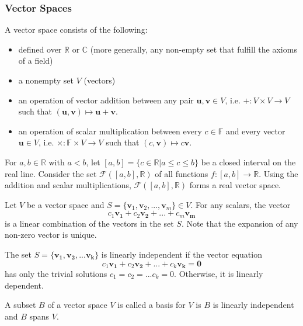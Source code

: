 \documentclass[a4paper]{article}
\begin{document}
\subsubsection*{Vector Spaces}
\begin{defi}
A vector space consists of the following:
\begin{itemize}
\item defined over $\mathbb{R}$ or $\mathbb{C}$ (more generally, any non-empty set that fulfill the axioms of a field)
\item a nonempty set $V$ (vectors)
\item an operation of vector addition between any pair $\mathbf{u},\mathbf{v}\in V$, i.e. $+:V\times V\rightarrow V$ such that $(\mathbf{u},\mathbf{v})\mapsto\mathbf{u}+\mathbf{v}$.
\item an operation of scalar multiplication between every $c\in\mathbb{F}$ and every vector $\mathbf{u}\in V$, i.e. $\times:\mathbb{F}\times V\rightarrow V$ such that $(c,\mathbf{v})\mapsto c\mathbf{v}$.
\end{itemize}
\end{defi}
\begin{eg}
For $a,b\in\mathbb{R}$ with $a<b$, let $[a,b]=\{c\in\mathbb{R}|a\leq c\leq b\}$ be a closed interval on the real line. Consider the set $\mathcal{F}([a,b],\mathbb{R})$ of all functions $f:[a,b]\rightarrow\mathbb{R}$. Using the addition and scalar multiplications, $\mathcal{F}([a,b],\mathbb{R})$ forms a real vector space. 
\end{eg}
\begin{defi}
Let $V$ be a vector space and $S=\{\mathbf{v}_1,\mathbf{v}_2,...,\mathbf{v}_m\}\in V$. For any scalars, the vector
$$c_1\mathbf{v_1}+c_2\mathbf{v_2}+...+c_m\mathbf{v_m}$$
is a linear combination of the vectors in the set $S$. Note that the expansion of any non-zero vector is unique.
\end{defi}
\begin{defi}
The set $S=\{\mathbf{v_1},\mathbf{v_2},...\mathbf{v_k}\}$ is linearly independent if the vector equation
$$c_1\mathbf{v_1}+c_2\mathbf{v_2}+...+c_k\mathbf{v_k}=\boldsymbol{0}$$
has only the trivial solutions $c_1=c_2=...c_k=0$. Otherwise, it is linearly dependent.
\end{defi}
\begin{defi}[Basis]
A subset $B$ of a vector space $V$ is called a basis for $V$ is $B$ is linearly independent and $B$ spans $V$.
\end{defi}
\end{document}
